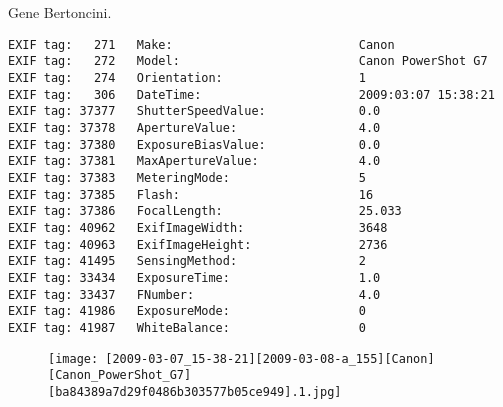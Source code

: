\section{\protect{}}
\noindent Gene Bertoncini.
\noindent
\begin{lstlisting}
EXIF tag:   271   Make:                          Canon
EXIF tag:   272   Model:                         Canon PowerShot G7
EXIF tag:   274   Orientation:                   1
EXIF tag:   306   DateTime:                      2009:03:07 15:38:21
EXIF tag: 37377   ShutterSpeedValue:             0.0
EXIF tag: 37378   ApertureValue:                 4.0
EXIF tag: 37380   ExposureBiasValue:             0.0
EXIF tag: 37381   MaxApertureValue:              4.0
EXIF tag: 37383   MeteringMode:                  5
EXIF tag: 37385   Flash:                         16
EXIF tag: 37386   FocalLength:                   25.033
EXIF tag: 40962   ExifImageWidth:                3648
EXIF tag: 40963   ExifImageHeight:               2736
EXIF tag: 41495   SensingMethod:                 2
EXIF tag: 33434   ExposureTime:                  1.0
EXIF tag: 33437   FNumber:                       4.0
EXIF tag: 41986   ExposureMode:                  0
EXIF tag: 41987   WhiteBalance:                  0

\end{lstlisting}
\clearpage
\begin{figure}
\raggedleft
\texttt{[image: [2009-03-07\_15-38-21][2009-03-08-a\_155][Canon][Canon\_PowerShot\_G7][ba84389a7d29f0486b303577b05ce949].1.jpg]}
\end{figure}


\clearpage
